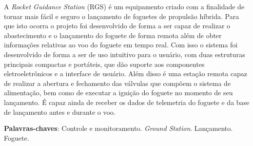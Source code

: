 \begin{resumo}
A \textit{Rocket Guidance Station} (RGS) é um equipamento criado com a finalidade de tornar mais fácil e seguro o lançamento de foguetes de propulsão híbrida. Para que isto ocorra o projeto foi desenvolvido de forma a ser capaz de realizar o abastecimento e o lançamento do foguete de forma remota além de obter informações relativas ao voo do foguete em tempo real. Com isso o sistema foi desenvolvido de forma a ser de uso intuitivo para o usuário, com duas estruturas principais compactas e portáteis, que dão suporte aos componentes eletroeletrônicos e a interface de usuário. Além disso é uma estação remota capaz de realizar a abertura e fechamento das válvulas que compõem o sistema de alimentação, bem como de executar a ignição do foguete no momento de seu lançamento. É capaz ainda de receber os dados de telemetria do foguete e da base de lançamento antes e durante o voo.


 \vspace{\onelineskip}
    
 \noindent
 \textbf{Palavras-chaves}: Controle e monitoramento. \textit{Ground Station}. Lançamento. Foguete.
\end{resumo}

